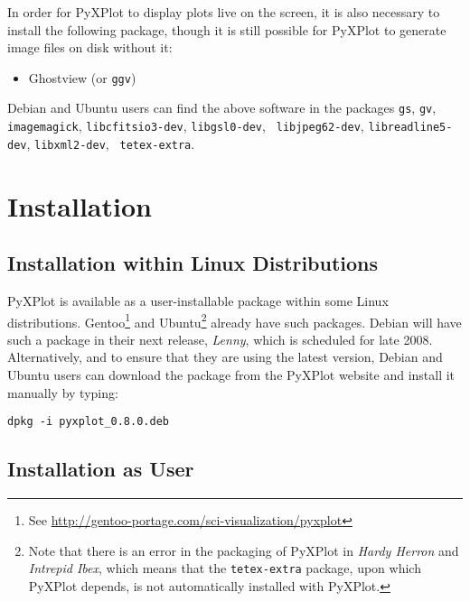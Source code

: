 \noindent In order for PyXPlot to display plots live on the screen, it is also necessary to install the following package, though it is still possible for PyXPlot to generate image files on disk without it:

\vspace{0.5cm}
\begin{itemize}
\item Ghostview (or {\tt ggv}) 
\end{itemize}
\vspace{0.5cm}

Debian and Ubuntu users can find the above software in the packages {\tt gs},
{\tt gv}, {\tt imagemagick}, {\tt libcfitsio3-dev}, {\tt libgsl0-dev}, {\tt
libjpeg62-dev}, {\tt libreadline5-dev}, {\tt libxml2-dev}, {\tt
tetex-extra}.

\section{Installation}

\subsection{Installation within Linux Distributions}

PyXPlot is available as a user-installable package within some Linux
distributions. Gentoo\footnote{See \url{http://gentoo-portage.com/sci-visualization/pyxplot}}
and Ubuntu\footnote{Note
that there is an error in the packaging of PyXPlot in {\it Hardy Herron} and
{\it Intrepid Ibex}, which means that the {\tt tetex-extra} package, upon which
PyXPlot depends, is not automatically installed with PyXPlot.} already have
such packages. Debian will have such a package in their next release, {\it
Lenny}, which is scheduled for late 2008. Alternatively, and to ensure that
they are using the latest version, Debian and Ubuntu users can download the
package from the PyXPlot website and install it manually by typing:

\begin{verbatim}
dpkg -i pyxplot_0.8.0.deb
\end{verbatim}

\subsection{Installation as User}

